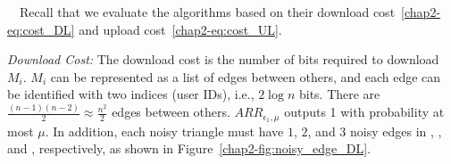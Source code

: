 \smallskip
{}~~Recall that we evaluate the algorithms based on their download cost~\eqref{chap2-eq:cost_DL} and upload cost~\eqref{chap2-eq:cost_UL}.

\textit{Download Cost:} The download cost is the number of bits required
to download $M_i$.
$M_i$ can be represented
as
a list of edges between others, and each edge
can be
identified with two indices (user IDs), i.e., $2 \log n$ bits.
There are $\frac{(n-1)(n-2)}{2} \approx \frac{n^2}{2}$ edges between others.
$ARR_{\epsilon_1,\mu}$ outputs 1 with probability at most $\mu$. 
In addition, each noisy triangle must have $1$, $2$, and $3$ noisy edges in \AlgOne{}, \AlgTwo{}, and \AlgThree{}, respectively, as shown in Figure~\ref{chap2-fig:noisy_edge_DL}.

